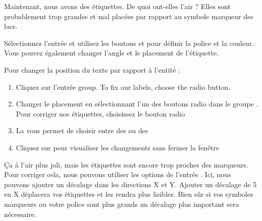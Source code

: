 Maintenant, nous avons des étiquettes. De quoi ont-elles l'air ? Elles sont 
probablement trop grandes et mal placées par rapport au symbole marqueur des lacs.

Sélectionnez l'entrée  et utilisez les boutons  et 
 pour définir la police et la couleur. Vous pouvez également 
changer l'angle et le placement de l'étiquette.

Pour changer la position du texte par rapport à l'entité :

\begin{enumerate}
\item Cliquez sur l'entrée 
 group. To fix our labels, choose the  radio button.
\item Changer le placement en sélectionnant l'un des boutons radio dans le groupe 
. Pour corriger nos étiquettes, choisissez le bouton radio 
\item La  vous permet de choisir entre 
des  ou des 
\item Cliquez sur  pour visualiser les changements sans fermer 
la fenêtre
\end{enumerate}

Ça à l'air plus joli, mais les étiquettes sont encore trop proches des marqueurs. 
Pour corriger cela, nous pouvons utiliser les options de l'entrée . 
Ici, nous pouvons ajouter un décalage dans les directions X et Y. Ajouter un 
décalage de 5 en X déplacera vos étiquettes et les rendra plus lisibles. Bien 
sûr si vos symboles marqueurs ou votre police sont plus grands un décalage plus 
important sera nécessaire.


